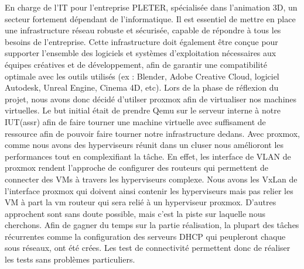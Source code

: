 \documentclass[../file.tex]{subfiles}
\begin{document}
En charge de l'IT pour l'entreprise PLETER, spécialisée dans l'animation 3D, un secteur fortement dépendant de l'informatique. Il est essentiel de mettre en place une infrastructure réseau robuste et sécurisée, capable de répondre à tous les besoins de l'entreprise. Cette infrastructure doit également être conçue pour supporter l'ensemble des logiciels et systèmes d'exploitation nécessaires aux équipes créatives et de développement, afin de garantir une compatibilité optimale avec les outils utilisés (ex : Blender, Adobe Creative Cloud, logiciel Autodesk, Unreal Engine, Cinema 4D, etc).
\newline
Lors de la phase de réflexion du projet, nous avons donc décidé d'utilser proxmox afin de virtualiser
nos machines virtuelles. Le but initial
était de prendre Qemu sur le serveur interne à notre IUT(assr) afin de faire tourner une machine virtuelle
avec suffisament de ressource afin de pouvoir faire tourner notre infrastructure dedans.
Avec proxmox, comme nous avons des hyperviseurs réunit dans un cluser nous amélioront les performances tout en 
complexifiant la tâche. En effet, les interface de VLAN de proxmox rendent l'approche de configurer des routeurs 
qui permettent de connecter des VMs à travers les hyperviseurs complexe. Nous avons les VxLan de l'interface proxmox 
qui doivent ainsi contenir les hyperviseurs mais pas relier les VM à part la vm routeur qui sera relié à un hyperviseur proxmox.
D'autres approchent sont sans doute possible, mais c'est la piste sur laquelle nous cherchons.
Afin de gagner du temps sur la partie réalisation, la plupart des tâches récurrentes comme la configuration des serveurs 
DHCP qui peupleront chaque sous réseaux, ont été crées. Les test de connectivité permettent donc de réaliser les tests sans problèmes
particuliers.
\end{document}
